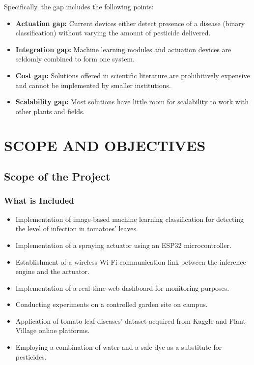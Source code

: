\documentclass[12pt,a4paper,oneside]{report}
\begin{document}
Specifically, the gap includes the following points:

\begin{itemize}[leftmargin=2em]
    \item \textbf{Actuation gap:} Current devices either detect presence of a disease (binary classification) without varying the amount of pesticide delivered.
    \item \textbf{Integration gap:} Machine learning modules and actuation devices are seldomly combined to form one system.
    \item \textbf{Cost gap:} Solutions offered in scientific literature are prohibitively expensive and cannot be implemented by smaller institutions.
    \item \textbf{Scalability gap:} Most solutions have little room for scalability to work with other plants and fields.
\end{itemize}

\chapter{SCOPE AND OBJECTIVES}

\section{Scope of the Project}

\subsection{What is Included}

\begin{itemize}[leftmargin=2em]
    \item Implementation of image-based machine learning classification for detecting the level of infection in tomatoes' leaves.
    \item Implementation of a spraying actuator using an ESP32 microcontroller.
    \item Establishment of a wireless Wi-Fi communication link between the inference engine and the actuator.
    \item Implementation of a real-time web dashboard for monitoring purposes.
    \item Conducting experiments on a controlled garden site on campus.
    \item Application of tomato leaf diseases' dataset acquired from Kaggle and Plant Village online platforms.
    \item Employing a combination of water and a safe dye as a substitute for pesticides.
\end{itemize}
\end{document}
